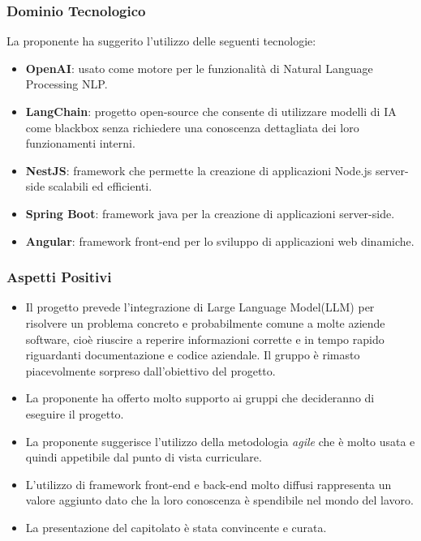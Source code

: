 \documentclass[a4paper, 12pt]{article}
\begin{document}
\subsubsection{Dominio Tecnologico}
La proponente ha suggerito l’utilizzo delle seguenti tecnologie:
\begin{itemize}
    \item \textbf{OpenAI}: usato come motore per le funzionalità di Natural Language Processing NLP.
    \item \textbf{LangChain}: progetto open-source che consente di utilizzare modelli di IA come blackbox senza richiedere una conoscenza dettagliata dei loro funzionamenti interni.
    \item \textbf{NestJS}: framework che permette la creazione di applicazioni Node.js server-side scalabili ed efficienti.
    \item \textbf{Spring Boot}: framework java per la creazione di applicazioni server-side.
    \item \textbf{Angular}: framework front-end per lo sviluppo di applicazioni web dinamiche.
    
\end{itemize}

\subsubsection{Aspetti Positivi}
\begin{itemize}
    \item Il progetto prevede l’integrazione di Large Language Model(LLM) per risolvere un problema concreto e probabilmente comune a molte aziende software, cioè riuscire a reperire informazioni corrette e in tempo rapido riguardanti documentazione e codice aziendale.
    Il gruppo è rimasto piacevolmente sorpreso dall'obiettivo del progetto.
    
    \item La proponente ha offerto molto supporto ai gruppi che decideranno di eseguire il progetto.
    
    \item La proponente suggerisce l’utilizzo della metodologia \textit{agile} che è molto usata e quindi appetibile dal punto di vista curriculare.
    
    \item L’utilizzo di framework front-end e back-end molto diffusi rappresenta un valore aggiunto dato che la loro conoscenza è spendibile nel mondo del lavoro.
    
    \item La presentazione del capitolato è stata convincente e curata.
    
\end{itemize}
\end{document}
